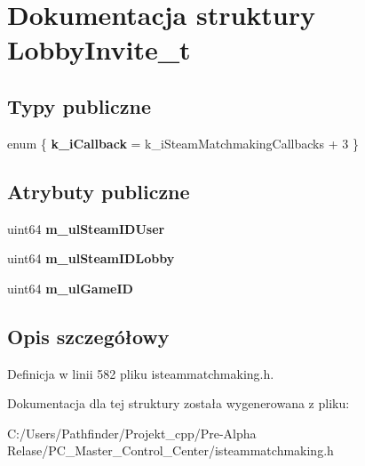 \hypertarget{struct_lobby_invite__t}{}\section{Dokumentacja struktury Lobby\+Invite\+\_\+t}
\label{struct_lobby_invite__t}
\subsection*{Typy publiczne}
\begin{DoxyCompactItemize}
\item 
\mbox{\label{struct_lobby_invite__t_abb159fbc59e6137b7ba1f9e9adaa6008}} 
enum \{ {\bfseries k\+\_\+i\+Callback} = k\+\_\+i\+Steam\+Matchmaking\+Callbacks + 3
 \}
\end{DoxyCompactItemize}
\subsection*{Atrybuty publiczne}
\begin{DoxyCompactItemize}
\item 
\mbox{\label{struct_lobby_invite__t_aaba5b1cf3c1c2d20c33b87bb086c74aa}} 
uint64 {\bfseries m\+\_\+ul\+Steam\+I\+D\+User}
\item 
\mbox{\label{struct_lobby_invite__t_a243c336486a8b0fab08f53c1c7a6ddae}} 
uint64 {\bfseries m\+\_\+ul\+Steam\+I\+D\+Lobby}
\item 
\mbox{\label{struct_lobby_invite__t_a5233bdc26ba620a23985fe667098d56a}} 
uint64 {\bfseries m\+\_\+ul\+Game\+ID}
\end{DoxyCompactItemize}


\subsection{Opis szczegółowy}


Definicja w linii 582 pliku isteammatchmaking.\+h.



Dokumentacja dla tej struktury została wygenerowana z pliku\+:\begin{DoxyCompactItemize}
\item 
C\+:/\+Users/\+Pathfinder/\+Projekt\+\_\+cpp/\+Pre-\/\+Alpha Relase/\+P\+C\+\_\+\+Master\+\_\+\+Control\+\_\+\+Center/isteammatchmaking.\+h\end{DoxyCompactItemize}
